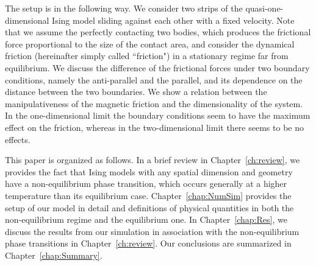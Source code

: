 The setup is in the following way. We consider two strips of the quasi-one-dimensional Ising model sliding against each other with a fixed velocity. Note that we assume the perfectly contacting two bodies, which produces the frictional force proportional to the size of the contact area, and consider the dynamical friction (hereinafter simply called ``friction") in a stationary regime far from equilibrium. We discuss the difference of the frictional forces under two boundary conditions, namely the anti-parallel and the parallel, and its dependence on the distance between the two boundaries. We show a relation between the manipulativeness of the magnetic friction  and the dimensionality of the system. In the one-dimensional limit the boundary conditions seem to have the maximum effect on the friction, whereas in the two-dimensional limit there seems to be no effects.

This paper is organized as follows. In a brief review in Chapter~\ref{ch:review}, we provides the fact that Ising models with any spatial dimension and geometry have a non-equilibrium phase transition, which occurs generally at a higher temperature than its equilibrium case. Chapter~\ref{chap:NumSim} provides the setup of our model in detail and definitions of physical quantities in both the non-equilibrium regime and the equilibrium one. In Chapter~\ref{chap:Res}, we discuss the results from our simulation in association with the non-equilibrium phase transitions in Chapter~\ref{ch:review}. Our conclusions are summarized in Chapter~\ref{chap:Summary}.
 

